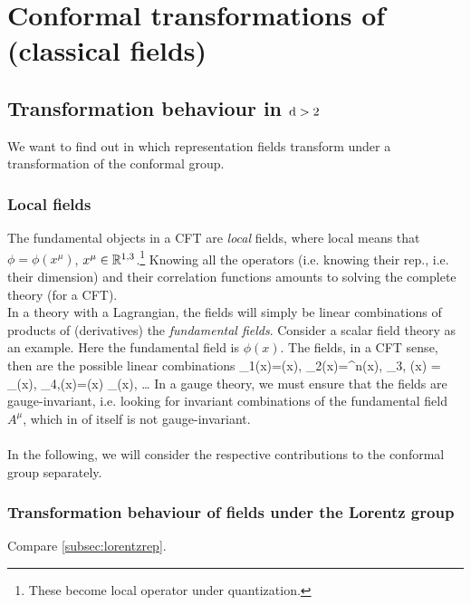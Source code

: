 \section{Conformal transformations of (classical fields)}
\subsection{Transformation behaviour in $\mathrm{d}>2$}
We want to find out in which representation fields transform under a transformation of the conformal group.
\subsubsection{Local fields}
The fundamental objects in a CFT are \emph{local} fields, where local means that $\phi=\phi(x^\mu)$, $x^\mu \in \mathbb{R}^{1,3}$.\footnote{These become local operator under quantization.} Knowing all the operators (i.e. knowing their rep., i.e. their dimension) and their correlation functions amounts to solving the complete theory (for a CFT).\\
In a theory with a Lagrangian, the fields will simply be linear combinations of products of (derivatives) the \emph{fundamental fields}. Consider a scalar field theory as an example. Here the fundamental field is $\phi(x)$. The fields, in a CFT sense, then are the possible linear combinations
\bse
\mO_1(x)=\phi(x),\;  \mO_2(x)=\phi^n(x),\; \mO_{3,\mu} (x) = \partial_\mu \phi(x),\; \mO_{4,\mu}(x)=\phi(x) \partial_\mu \phi(x), \; \dots 
\ese 
In a gauge theory, we must ensure that the fields are gauge-invariant, i.e. looking for invariant combinations of the fundamental field $A^\mu$, which in of itself is not gauge-invariant.
\\
\\
In the following, we will consider the respective contributions to the conformal group separately.
\subsubsection{Transformation behaviour of fields under the Lorentz group}
Compare \ref{subsec:lorentzrep}.

